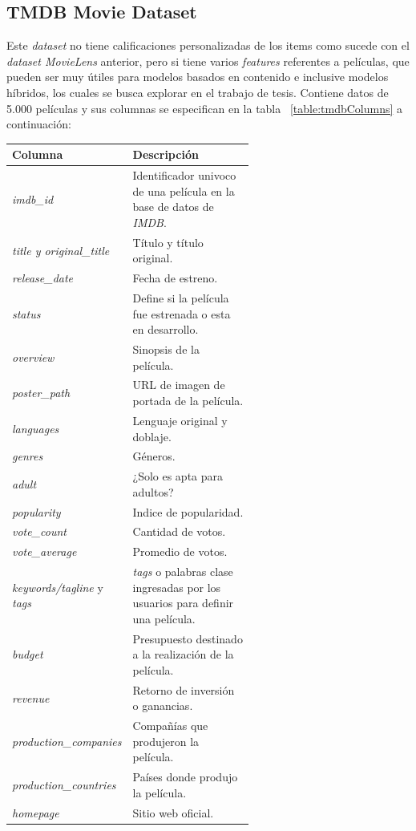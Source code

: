 \documentclass[11pt,a4paper,twoside]{thesis}
\begin{document}
\clearpage

\subsection{TMDB Movie Dataset}

Este \textit{dataset} \cite{tmdb} no tiene calificaciones personalizadas de los items como sucede con el \textit{dataset MovieLens} anterior, pero si tiene varios \textit{features} referentes a películas, que pueden ser muy útiles para modelos basados en contenido e inclusive modelos híbridos, los cuales se busca explorar en el trabajo de tesis. Contiene datos de 5.000 películas y sus columnas se especifican en la tabla ~\ref{table:tmdbColumns} a continuación:


\begin{table}[!htb]
	\centering
	\footnotesize
	\begin{tabular}{l | p{0.6\linewidth}}
	\hline
		Columna                      & Descripción \\
	\hline
	\textit{imdb\_id}                & Identificador univoco de una película en la base de datos de \textit{IMDB}. \\
	\textit{title y original\_title} & Título y título original. \\
	\textit{release\_date}           & Fecha de estreno. \\
	\textit{status}                  & Define si la película fue estrenada o esta en desarrollo. \\
	\textit{overview}                & Sinopsis de la película. \\
	\textit{poster\_path}            & URL de imagen de portada de la película. \\ 
	\textit{languages}               & Lenguaje original y doblaje. \\
	\textit{genres}                  & Géneros. \\
	\textit{adult}                   & ¿Solo es apta para adultos? \\
	\textit{popularity}              & Indice de popularidad. \\
	\textit{vote\_count}      		 & Cantidad de votos. \\
	\textit{vote\_average}      		 & Promedio de votos. \\
	\textit{keywords/tagline} y \textit{tags} & \textit{tags} o palabras clase ingresadas por los usuarios para definir una película. \\
	\textit{budget}                  & Presupuesto destinado a la realización de la película. \\
	\textit{revenue}          	     & Retorno de inversión o ganancias. \\
	\textit{production\_companies}    & Compañías que produjeron la película. \\ 
	\textit{production\_countries}    & Países donde produjo la película. \\ 
	\textit{homepage}                & Sitio web oficial. \\


\end{tabular}
\end{table}
\end{document}
